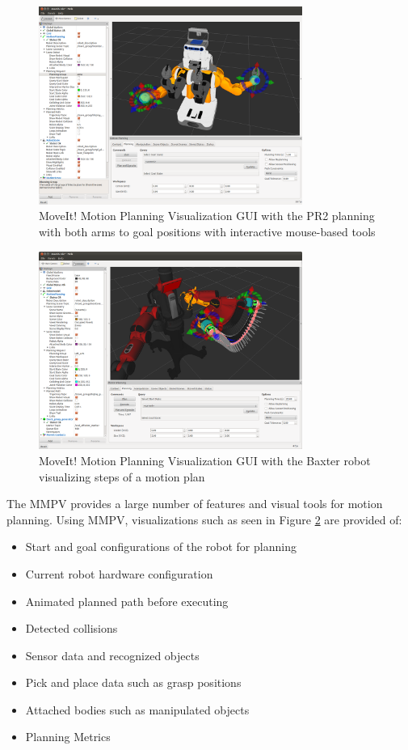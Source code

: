 \documentclass[10pt,journal,compsoc]{joser1}
\begin{document}
{\begin{figure}[!t]
\centering
\includegraphics[width=3.4in]{images/rviz_motion_planning}
\caption{MoveIt! Motion Planning Visualization GUI with the PR2 planning with both arms to goal positions with interactive mouse-based tools}
\label{fig:motionrvizplugin}
\end{figure}

\begin{figure}[!t]
\centering
\includegraphics[width=3.4in]{images/motion_plan}
\caption{MoveIt! Motion Planning Visualization GUI with the Baxter robot visualizing steps of a motion plan}
\label{fig:motion_plan}	
\end{figure}

The MMPV provides a large number of features and visual tools for motion planning. Using MMPV, visualizations such as seen in Figure \ref{fig:motion_plan} are provided of:

\begin{itemize}
    \item Start and goal configurations of the robot for planning
    \item Current robot hardware configuration
    \item Animated planned path before executing
    \item Detected collisions
    \item Sensor data and recognized objects
    \item Pick and place data such as grasp positions
    \item Attached bodies such as manipulated objects
    \item Planning Metrics
\end{itemize}

}
\end{document}
